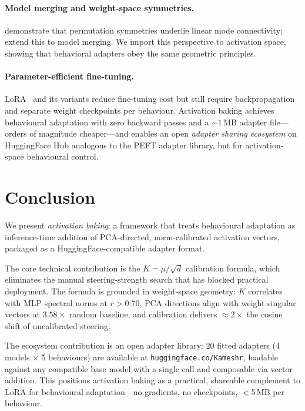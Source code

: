 \documentclass{article}
\begin{document}
\paragraph{Model merging and weight-space symmetries.}
\citet{ainsworth2023git} demonstrate that permutation symmetries underlie linear mode
connectivity; \citet{stoica2024model} extend this to model merging.
We import this perspective to activation space, showing that behavioral adapters obey
the same geometric principles.

\paragraph{Parameter-efficient fine-tuning.}
LoRA~\cite{hu2022lora} and its variants reduce fine-tuning cost but still require
backpropagation and separate weight checkpoints per behaviour.
Activation baking achieves behavioural adaptation with zero backward passes and a
${\sim}1$\,MB adapter file—orders of magnitude cheaper—and enables an open
\emph{adapter sharing ecosystem} on HuggingFace Hub analogous to the PEFT adapter
library, but for activation-space behavioural control.

\section{Conclusion}
\label{sec:conclusion}

We present \emph{activation baking}: a framework that treats behavioural adaptation as
inference-time addition of PCA-directed, norm-calibrated activation vectors, packaged
as a HuggingFace-compatible adapter format.

The core technical contribution is the $K = \mu/\sqrt{d}$ calibration formula, which
eliminates the manual steering-strength search that has blocked practical deployment.
The formula is grounded in weight-space geometry: $K$ correlates with MLP spectral
norms at $r > 0.70$, PCA directions align with weight singular vectors at $3.58\times$
random baseline, and calibration delivers ${\approx}2\times$ the cosine shift of
uncalibrated steering.

The ecosystem contribution is an open adapter library: 20 fitted adapters
(4 models $\times$ 5 behaviours) are available at \texttt{huggingface.co/Kameshr},
loadable against any compatible base model with a single call and composable via
vector addition.
This positions activation baking as a practical, shareable complement to LoRA for
behavioural adaptation—no gradients, no checkpoints, $<$5\,MB per behaviour.
\end{document}
